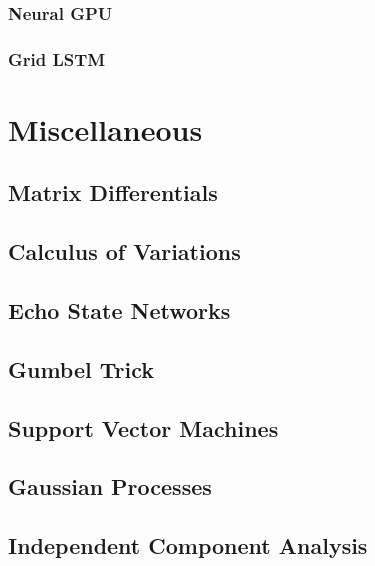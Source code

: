 \documentclass[12pt]{article}
\begin{document}
\subsubsection{Neural GPU}

\subsubsection{Grid LSTM}

\section{Miscellaneous}

\subsection{Matrix Differentials}

\subsection{Calculus of Variations}

\subsection{Echo State Networks}

\subsection{Gumbel Trick}

\subsection{Support Vector Machines}

\subsection{Gaussian Processes}

\subsection{Independent Component Analysis}
\end{document}
